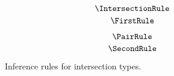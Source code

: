 
\begin{figure}
    \centering
    \begin{minipage}{0.5\textwidth}
        $$\IntersectionRule$$
        $$\FirstRule$$
    \end{minipage}%
    \begin{minipage}{0.5\textwidth}
        $$\PairRule$$
        $$\SecondRule$$
    \end{minipage}
    \caption{
        Inference rules for intersection types.
    }
\end{figure}
